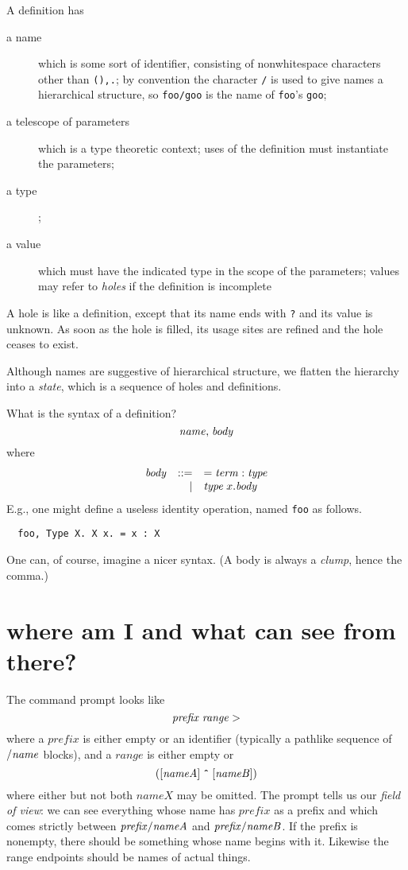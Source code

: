 \documentclass{article}
\begin{document}
A definition has
\begin{description}
\item[a name] which is some sort of identifier, consisting of nonwhitespace
  characters other than {\tt (),.}; by convention the character {\tt /} is
  used to give names a hierarchical structure, so {\tt foo/goo} is the name
  of {\tt foo}'s {\tt goo};
\item[a telescope of parameters] which is a type theoretic context; uses of
  the definition must instantiate the parameters;
\item[a type];
\item[a value] which must have the indicated type in the scope of the
  parameters; values may refer to \emph{holes} if the definition is incomplete
\end{description}

A hole is like a definition, except that its name ends with {\tt ?} and its value is unknown. As soon as the hole is filled, its usage sites are refined and the hole ceases to exist.

Although names are suggestive of hierarchical structure, we flatten the
hierarchy into a \emph{state}, which is a sequence of holes and definitions.

What is the syntax of a definition?
\[
  \mathit{name}{\tt ,}\;\mathit{body}
\]
where
\[\begin{array}{rrl}
\mathit{body} & ::= & {\tt =}\;\mathit{term}\;{\tt :}\;\mathit{type} \\
              &   | & \mathit{type}\;x.\mathit{body} \\
\end{array}\]
E.g., one might define a useless identity operation, named {\tt foo} as follows.
\begin{verbatim}
  foo, Type X. X x. = x : X
\end{verbatim}

One can, of course, imagine a nicer syntax. (A body is always a
\emph{clump}, hence the comma.)


\section{where am I and what can see from there?}

The command prompt looks like
\[
  \mathit{prefix}\;\mathit{range}\;{\tt>}
\]
where a $\mathit{prefix}$ is either empty or an identifier (typically
a pathlike sequence of ${\tt /}\mathit{name}$ blocks), and a
$\mathit{range}$ is either empty or
\[
  {\tt (}[\mathit{nameA}]\;\mbox{\tt \^{}}\;[\mathit{nameB}]{\tt )}
\]
where either but not both $\mathit{nameX}$ may be omitted.
The prompt tells us our \emph{field of view}: we can see everything whose name
has $\mathit{prefix}$ as a prefix and which comes strictly between $\mathit{prefix}{\tt /}\mathit{nameA}$ and $\mathit{prefix}{\tt /}\mathit{nameB}$. If the prefix is nonempty, there should be something whose name begins with it. Likewise the range endpoints should be
names of actual things.
\end{document}
